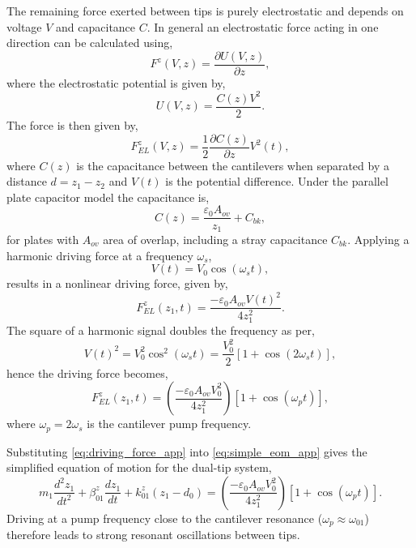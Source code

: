 \documentclass{article}
\begin{document}
The remaining force exerted between tips is purely electrostatic and depends on voltage $V$ and capacitance $C$. In general an electrostatic force acting in one direction can be calculated using,
\begin{equation} F^z(V,z) = \frac{\partial U(V,z)}{\partial z}, \end{equation}
where the electrostatic potential is given by,
\begin{equation} U(V,z) = \frac{C(z)V^2}{2}. \end{equation}
The force is then given by,
\begin{equation} F_{EL}^z(V,z) = \frac{1}{2} \frac{\partial C(z)}{\partial z} V^2(t), \end{equation}
where $C(z)$ is the capacitance between the cantilevers when separated by a distance $d=z_1-z_2$ and $V(t)$ is the potential difference. Under the parallel plate capacitor model the capacitance is,
\begin{equation} C(z) = \frac{\varepsilon_0 A_{ov}}{z_1} + C_{bk}, \end{equation}
for plates with $A_{ov}$ area of overlap, including a stray capacitance $C_{bk}$. Applying a harmonic driving force at a frequency $\omega_s$,
\begin{equation} V(t)=V_0 \cos(\omega_s t), \end{equation}
results in a nonlinear driving force, given by,
\begin{equation} F_{EL}^z(z_1,t) = \frac{-\varepsilon_0 A_{ov} V(t)^2}{4z_1^2}. \end{equation}
The square of a harmonic signal doubles the frequency as per,
\begin{equation} V(t)^2 = V_0^2\cos^2(\omega_st) = \frac{V_0^2}{2}\left[1+\cos(2\omega_st)\right], \end{equation}
hence the driving force becomes,
\begin{equation}
	F_{EL}^z(z_1,t) = \left(\frac{-\varepsilon_0 A_{ov} V_0^2}{4z_1^2}\right)\left[1+\cos(\omega_pt)\right],
\label{eq:driving_force_app}
\end{equation}
where $\omega_p = 2\omega_s$ is the cantilever pump frequency.

Substituting \eqref{eq:driving_force_app} into \eqref{eq:simple_eom_app} gives the simplified equation of motion for the dual-tip system,
\begin{equation}
	m_1 \frac{d^2z_1}{dt^2} + \beta_{01}^z \frac{dz_1}{dt} + k_{01}^z (z_1-d_0) = \left( \frac{-\varepsilon_0 A_{ov} V_0^2}{4z_1^2}\right)\left[1+\cos(\omega_pt)\right].
\label{eq:final_eom_app}
\end{equation}
Driving at a pump frequency close to the cantilever resonance ($\omega_p \approx \omega_{01}$) therefore leads to strong resonant oscillations between tips.
 
\end{document}
